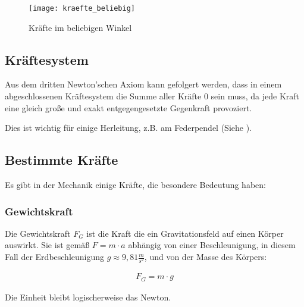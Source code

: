 \begin{figure}[h!]
	\centering
	\texttt{[image: kraefte\_beliebig]}
	\caption{Kräfte im beliebigen Winkel}
	\label{fig:kraefte_beliebig}
\end{figure}



\subsection{Kräftesystem}

Aus dem dritten Newton'schen Axiom kann gefolgert werden, dass in einem abgeschlossenen Kräftesystem die Summe aller Kräfte $0$ sein muss, da jede Kraft eine gleich große und exakt entgegengesetzte Gegenkraft provoziert.

Dies ist wichtig für einige Herleitung, z.B. am Federpendel (Siehe ).


\subsection{Bestimmte Kräfte}

Es gibt in der Mechanik einige Kräfte, die besondere Bedeutung haben:


\subsubsection{Gewichtskraft}

Die Gewichtskraft $F_{G}$ ist die Kraft die ein Gravitationsfeld auf einen Körper auswirkt. Sie ist gemäß $F = m \cdot a$ abhängig von einer Beschleunigung, in diesem Fall der Erdbeschleunigung $g \approx 9,81 \frac{m}{s^2}$, und von der Masse des Körpers:

\begin{align}
	F_{G} = m \cdot g
\end{align}

\noindent Die Einheit bleibt logischerweise das Newton.